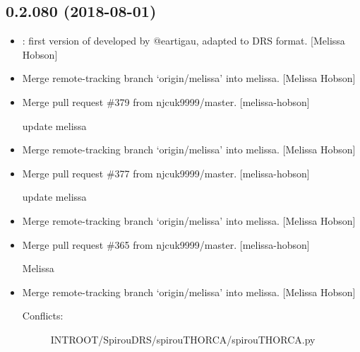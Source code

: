 \documentclass[a4paper,10pt,english]{report}
\begin{document}
\subsection{0.2.080 (2018-08-01)}
\label{\detokenize{misc/changelog:id383}}\begin{itemize}
\item {} 
: first version of  developed by
@eartigau, adapted to DRS format. {[}Melissa Hobson{]}

\item {} 
Merge remote-tracking branch ‘origin/melissa’ into melissa. {[}Melissa
Hobson{]}

\item {} 
Merge pull request \#379 from njcuk9999/master. {[}melissa-hobson{]}

update melissa

\item {} 
Merge remote-tracking branch ‘origin/melissa’ into melissa. {[}Melissa
Hobson{]}

\item {} 
Merge pull request \#377 from njcuk9999/master. {[}melissa-hobson{]}

update melissa

\item {} 
Merge remote-tracking branch ‘origin/melissa’ into melissa. {[}Melissa
Hobson{]}

\item {} 
Merge pull request \#365 from njcuk9999/master. {[}melissa-hobson{]}

Melissa

\item {} 
Merge remote-tracking branch ‘origin/melissa’ into melissa. {[}Melissa
Hobson{]}
\begin{description}
\item[{Conflicts:}] \leavevmode
INTROOT/SpirouDRS/spirouTHORCA/spirouTHORCA.py

\end{description}

\end{itemize}
\end{document}
